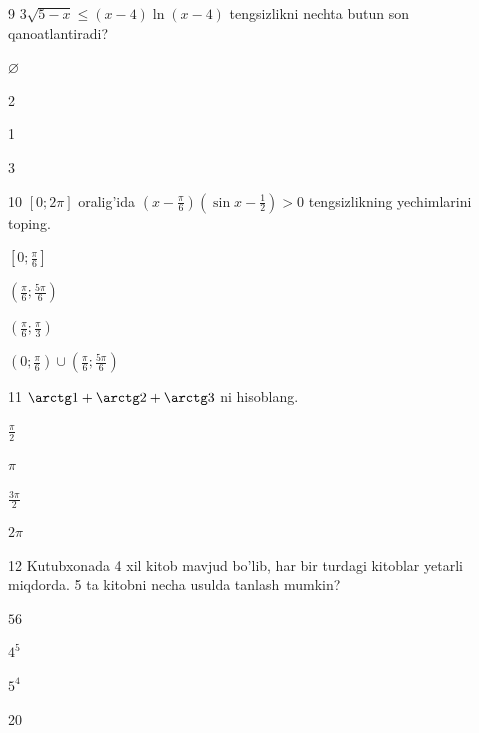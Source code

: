\documentclass[14pt]{article}
\begin{document}
\begin{questionbox}{9}
    \(3\sqrt{5-x} \le (x-4)\ln(x-4)\) tengsizlikni nechta butun son qanoatlantiradi?
    \begin{options}
        \item \(\varnothing\)
        \item 2
        \item 1
        \item 3
    \end{options}
\end{questionbox}

\begin{questionbox}{10}
    \([0; 2\pi]\) oralig'ida \(\left(x - \frac{\pi}{6}\right)\left(\sin x - \frac{1}{2}\right) > 0\) tengsizlikning yechimlarini toping.
    \begin{options}
        \item \(\left[0; \frac{\pi}{6}\right]\)
        \item \(\left(\frac{\pi}{6}; \frac{5\pi}{6}\right)\)
        \item \(\left(\frac{\pi}{6}; \frac{\pi}{3}\right)\)
        \item \(\left(0; \frac{\pi}{6}\right) \cup \left(\frac{\pi}{6}; \frac{5\pi}{6}\right)\)
    \end{options}
\end{questionbox}

\begin{questionbox}{11}
    \(\arctg 1 + \arctg 2 + \arctg 3\) ni hisoblang.
    \begin{options}
        \item \(\frac{\pi}{2}\)
        \item \(\pi\)
        \item \(\frac{3\pi}{2}\)
        \item \(2\pi\)
    \end{options}
\end{questionbox}

\begin{questionbox}{12}
    Kutubxonada 4 xil kitob mavjud bo'lib, har bir turdagi kitoblar yetarli miqdorda. 5 ta kitobni necha usulda tanlash mumkin?
    \begin{options}
        \item \(56\)
        \item \(4^5\)
        \item \(5^4\)
        \item 20
    \end{options}
\end{questionbox}
\end{document}
